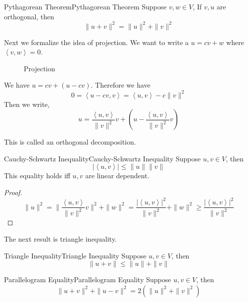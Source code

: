 \documentclass[../main.tex]{subfiles}
\begin{document}
\begin{proposition}{Pythagorean Theorem}{Pythagorean Theorem}
Suppose $v,w\in V$, If $v,u$ are orthogonal, then
\begin{equation*}
\|u+v\|^2 = \|u\|^2+ \|v\|^2
\end{equation*}
\end{proposition}

Next we formalize the idea of projection. We want to write a $u=cv+w$ where $\left<v,w\right> =0$.

\begin{figure}[H]
    \centering
    \caption{Projection}
    \label{fig:projection}
\end{figure}
We have $u=cv+(u-cv)$. Therefore we have
\begin{equation*}
0= \left<u-cv,v\right> = \left<u,v\right> - c \|v\|^2
\end{equation*}
Then we write,
\begin{equation*}
u = \frac{\left<u,v\right>}{\|v\|^2} v + \left(u- \frac{\left<u,v\right>}{\|v\|^2}v\right)
\end{equation*}

This is called an orthogonal decomposition.

\begin{theorem}{Cauchy-Schwartz Inequality}{Cauchy-Schwartz Inequality}
Suppose $u,v\in V$, then
\begin{equation*}
\left|\left<u,v\right>\right| \leq  \|u\| \|v\|
\end{equation*}
This equality holds iff $u,v$ are linear dependent.
\end{theorem}
\begin{proof}
\begin{equation*}
\|u\|^2 = \|\frac{\left<u,v\right>}{\|v\|^2}v\|^2 + \|w\|^2 = \frac{\left|\left<u,v\right>\right|^2}{\|v\|^2} + \|w\|^2 \geq \frac{\left|\left<u,v\right>\right|^2}{\|v\|^2}
\end{equation*}
\end{proof}

The next result is triangle inequality.
\begin{theorem}{Triangle Inequality}{Triangle Inequality}
Suppose $u,v\in V$, then
\begin{equation*}
\|u+v\| \leq \|u\|+\|v\|
\end{equation*}
\end{theorem}

\begin{proposition}{Parallelogram Equality}{Parallelogram Equality}
Suppose $u,v\in V$, then
\begin{equation*}
\|u+v\|^2 + \|u-v\|^2 = 2 \left(\|u\|^2 + \|v\|^2\right)
\end{equation*}
\end{proposition}
\end{document}

